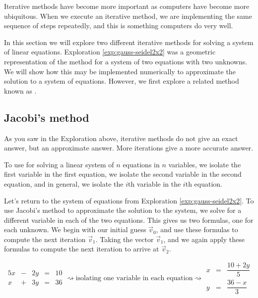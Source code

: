 \documentclass{ximera}
\begin{document}
Iterative methods have become more important as computers have become more ubiquitous.  When we execute an iterative method, we are implementing the same sequence of steps repeatedly, and this is something computers do very well.

In this section we will explore two different iterative methods for solving a system of linear equations.  Exploration \ref{exp:gauss-seidel2x2} was a geometric representation of the  method for a system of two equations with two unknowns.  We will show how this may be implemented numerically to approximate the solution to a system of equations.  However, we first  explore a related method known as .

\subsection*{Jacobi's method}
As you saw in the Exploration above, iterative methods do not give an exact answer, but an approximate answer.  More iterations give a more accurate answer.

To use  for solving a linear system of $n$ equations in $n$ variables, we isolate the first variable in the first equation, we isolate the second variable in the second equation, and in general, we isolate the $i$th variable in the $i$th equation.

Let's return to the system of equations from Exploration \ref{exp:gauss-seidel2x2}.  To use Jacobi's method to approximate the solution to the system, we solve for a different variable in each of the two equations.  This gives us two formulas, one for each unknown.  We begin with our initial guess $\vec{v}_0$, and use these formulas to compute the next iteration $\vec{v}_1$.  Taking the vector $\vec{v}_1$, and we again apply these formulas to compute the next iteration to arrive at $\vec{v}_2$.


\begin{equation*}\begin{array}{ccccc}
      5x& -&2y&=&10\\
      x & +&3y&= &36 
    \end{array}
\rightsquigarrow\text{isolating one variable in each equation}\rightsquigarrow
\begin{array}{ccc}
      x& =&\dfrac{10+2y}{5}\\
      y& =&\dfrac{36-x}{3}
    \end{array}
\end{equation*}
\end{document}
